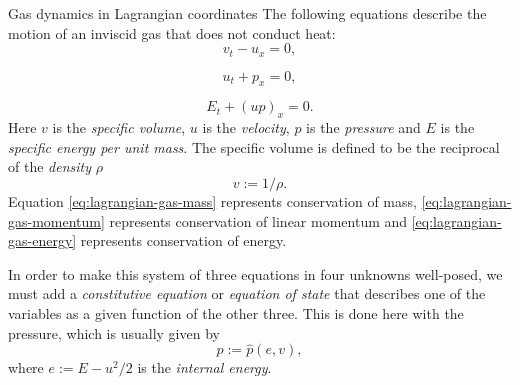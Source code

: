 \begin{Example}{Gas dynamics in Lagrangian coordinates}
\label{ex:lagrangian-gas-dynamics}
The following equations describe the motion of an inviscid gas that does not conduct heat:
\begin{equation}\label{eq:lagrangian-gas-mass}
v_t-u_x=0,
\end{equation}

\begin{equation}\label{eq:lagrangian-gas-momentum}
u_t+p_x=0,
\end{equation}

\begin{equation}\label{eq:lagrangian-gas-energy}
E_t+(up)_x=0.
\end{equation}
Here $v$ is the \emph{specific volume}, $u$ is the \emph{velocity}, $p$ is the \emph{pressure} and $E$ is the \emph{specific energy per unit mass}. The specific volume is defined to be the reciprocal of the \emph{density} $\rho$
\begin{equation}\label{eq:specific-volume-density}
v:=1/\rho.
\end{equation}
Equation \eqref{eq:lagrangian-gas-mass} represents conservation of mass, \eqref{eq:lagrangian-gas-momentum} represents conservation of linear momentum and \eqref{eq:lagrangian-gas-energy} represents conservation of energy.

In order to make this system of three equations in four unknowns well-posed, we must add a \emph{constitutive equation} or \emph{equation of state} that describes one of the variables as a given function of the other three. This is done here with the pressure, which is usually given by
\begin{equation}\label{eq:gas-pressure-state-equation}
p:=\hat p(e,v),
\end{equation}
where $e:=E-u^2/2$ is the \emph{internal energy}.
\end{Example}

